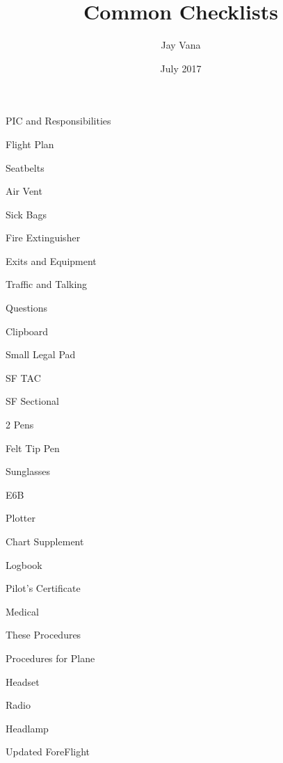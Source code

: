 \documentclass{article}
\title{Common Checklists}
\author{Jay Vana}
\date{July 2017}
\begin{document}
  


  \begin{multicols*}{2}


    \begin{clitemize}
      \item PIC and Responsibilities
      \item Flight Plan
      \item Seatbelts
      \item Air Vent
      \item Sick Bags
      \item Fire Extinguisher
      \item Exits and Equipment
      \item Traffic and Talking
      \item Questions
    \end{clitemize}


    \begin{clitemize}
      \item Clipboard
      \item Small Legal Pad
      \item SF TAC
      \item SF Sectional
      \item 2 Pens
      \item Felt Tip Pen
      \item Sunglasses
      \item E6B
      \item Plotter
      \item Chart Supplement
      \item Logbook
      \item Pilot's Certificate
      \item Medical
      \item These Procedures
      \item Procedures for Plane
      \item Headset
      \item Radio
      \item Headlamp
      \item Updated ForeFlight
    \end{clitemize}



\end{multicols*}
\end{document}
